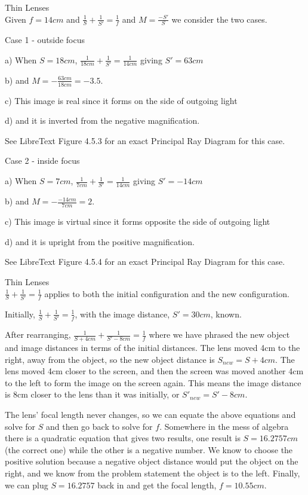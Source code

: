 \documentclass[10pt]{article}
\newenvironment{problem}[2][Problem]{\begin{trivlist}
\item[\hskip \labelsep {\bfseries #1}\hskip \labelsep {\bfseries #2.}]}{\end{trivlist}}
\begin{document}
\begin{problem}{6} Thin Lenses\\
Given $f=14cm$ and $\frac{1}{S}+\frac{1}{S'}=\frac{1}{f}$ and $M=\frac{-S'}{S}$ we consider the two cases.

\item Case 1 - outside focus
\item a) When $S=18cm$, $\frac{1}{18cm}+\frac{1}{S'}=\frac{1}{14cm}$ giving $S'=63cm$
\item b) and $M=-\frac{63cm}{18cm}=-3.5$.
\item c) This image is real since it forms on the side of outgoing light
\item d) and it is inverted from the negative magnification.
\item See LibreText Figure 4.5.3 for an exact Principal Ray Diagram for this case.

\item Case 2 - inside focus
\item a) When $S=7cm$, $\frac{1}{7cm}+\frac{1}{S'}=\frac{1}{14cm}$ giving $S'=-14cm$
\item b) and $M=-\frac{-14cm}{7cm}=2$.
\item c) This image is virtual since it forms opposite the side of outgoing light
\item d) and it is upright from the positive magnification.
\item See LibreText Figure 4.5.4 for an exact Principal Ray Diagram for this case.
\end{problem}

\begin{problem}{7} Thin Lenses\\
$\frac{1}{S}+\frac{1}{S'}=\frac{1}{f}$ applies to both the initial configuration and the new configuration.
\item
Initially, $\frac{1}{S}+\frac{1}{S'}=\frac{1}{f}$, with the image distance, $S'=30cm$, known.
\item
After rearranging, $\frac{1}{S+4cm}+\frac{1}{S'-8cm}=\frac{1}{f}$ where we have phrased the new object and image distances in terms of the initial distances. The lens moved 4cm to the right, away from the object, so the new object distance is $S_{new}=S+4cm$. The lens moved 4cm closer to the screen, and then the screen was moved another 4cm to the left to form the image on the screen again. This means the image distance is 8cm closer to the lens than it was initially, or $S'_{new}=S'-8cm$.
\item The lens' focal length never changes, so we can equate the above equations and solve for $S$ and then go back to solve for $f$. Somewhere in the mess of algebra there is a quadratic equation that gives two results, one result is $S=16.2757cm$ (the correct one) while the other is a negative number. We know to choose the positive solution because a negative object distance would put the object on the right, and we know from the problem statement the object is to the left. Finally, we can plug $S=16.2757$ back in and get the focal length, $f=10.55cm$.
\end{problem}
\end{document}
